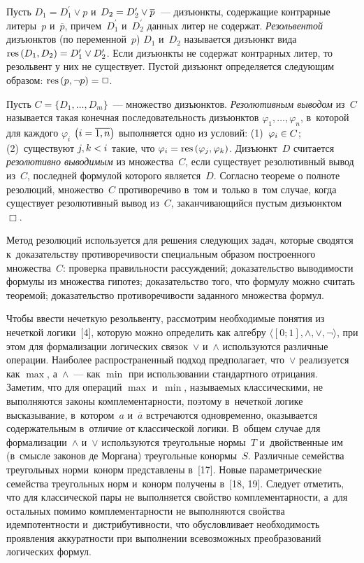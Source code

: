 \begin{multicols}{2}
  Пусть $D_1=D_1^\prime \vee p$  и~$D_2\hm= D_2^\prime \vee \overline{p}$~--- 
дизъюнкты, содержащие контрарные литеры~$p$ и~$\overline{p}$, 
причем~$D_1^\prime$ и~$D_2^\prime$ данных литер не содержат. 
\textit{Резольвентой} дизъюнктов (по переменной~$p$) $D_1$ и~$D_2$ 
называется дизъюнкт вида $\mathrm{res}\,(D_1, D_2) \hm= D_1^\prime \vee D_2^\prime$. 
Если дизъюнкты не содержат контрарных литер, то резольвент у них не 
существует. Пустой дизъюнкт определяется следующим образом: $\mathrm{res}\,(p,\neg p 
)\hm=\Box$.
  
  Пусть $C=\{D_1, \ldots , D_m\}$~--- множество дизъюнктов. 
\textit{Резолютивным выводом} из~$C$ называется такая конечная 
последовательность дизъюнктов $\varphi_1, \ldots, \varphi_n$, в~которой для 
каждого $\varphi_i$ $\left(i\hm= \overline{1,n}\right)$ выполняется одно из 
условий: (1)~$\varphi_i\hm\in C$; (2)~существуют $j,k\hm<i$ такие, что 
$\varphi_i\hm= \mathrm{res}\, (\varphi_j, \varphi_k)$. Дизъюнкт~$D$ считается 
\textit{резолютивно выводимым} из множества~$C$, если существует 
резолютивный вывод из~$C$, последней формулой которого является~$D$. 
Согласно теореме о полноте резолюций, множество~$C$ противоречиво в~том 
и~только в~том случае, когда существует резолютивный вывод из~$C$, 
заканчивающийся пустым дизъюнктом~$\Box$.
  
  Метод резолюций используется для решения следующих задач, которые 
сводятся к~доказательству противоречивости специальным образом 
построенного множества~$C$: проверка правильности рассуждений; 
доказательство выводимости формулы из множества гипотез; доказательство 
того, что формулу можно считать теоремой; доказательство противоречивости 
заданного множества формул.
  
  Чтобы ввести нечеткую резольвенту, рас\-смот\-рим необходимые понятия из 
нечеткой логики~[4], которую можно определить как алгебру $\langle  [0;1], 
\wedge,\vee,\neg\rangle$, при этом для формализации логических связок~$\vee$ 
и~$\wedge$ используются различные операции. Наиболее распространенный 
подход предполагает, что~$\vee$ реализуется как $\max$, а~$\wedge$~--- как 
$\min$ при использовании стандартного отрицания. Заметим, что для операций 
$\max$ и~$\min$, называемых классическими, не выполняются законы 
комплементарности, поэтому в~нечеткой логике высказывание, в~котором~$a$ 
и~$\overline{a}$ встречаются одновременно, оказывается содержательным 
в~отличие от классической логики. В~общем случае для 
формализации~$\wedge$ и~$\vee$ используются треугольные нормы~$T$ 
и~двойственные им (в~смысле законов де Моргана) треугольные конормы~$S$. 
Различные семейства треугольных норм\linebreak и~конорм представлены в~[17]. Новые 
параметрические семейства треугольных норм и~конорм получены в~[18, 19]. 
Следует отметить, что для классической пары не выполняется свойство 
\mbox{комплементарности}, а~для остальных помимо комплементарности не 
выполняются свойства идемпотентности и~дистрибутивности, что 
обусловливает необходимость проявления аккуратности при выполнении 
всевозможных преобразований логических формул.
  

\end{multicols}
